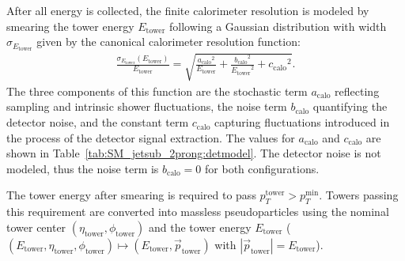 After all energy is collected, the finite calorimeter resolution is modeled by smearing the tower energy \ensuremath{E_{\text{tower}}}{} following a Gaussian distribution with width 
$\sigma_{\ensuremath{E_{\text{tower}}}}$ given by the canonical calorimeter resolution function:
\begin{align}
  \frac{\sigma_{\ensuremath{E_{\text{tower}}}}(\ensuremath{E_{\text{tower}}})}{\ensuremath{E_{\text{tower}}}} = \sqrt{\frac{\ensuremath{a_{\text{calo}}}^{2}}{\ensuremath{E_{\text{tower}}}} + \frac{\ensuremath{b_{\text{calo}}}^2}{\ensuremath{E_{\text{tower}}}^{2}} + \ensuremath{c_{\text{calo}}}^{2}}.
  \label{eq:SM_jetsub_2prong:caloreso}
\end{align}
The three components of this function are the stochastic term \ensuremath{a_{\text{calo}}}{} reflecting sampling and intrinsic shower fluctuations, the noise term \ensuremath{b_{\text{calo}}}{} quantifying the detector noise, 
and the constant term \ensuremath{c_{\text{calo}}}{} capturing fluctuations introduced in the process of the detector signal extraction.  
The values for \ensuremath{a_{\text{calo}}}{} and \ensuremath{c_{\text{calo}}}{} are shown in Table~\ref{tab:SM_jetsub_2prong:detmodel}. 
The detector noise is not modeled, thus the noise term is $\ensuremath{b_{\text{calo}}}=0$ for both configurations.

The tower energy after smearing is required to pass $\ensuremath{p_{T}^{\text{tower}}} > \ensuremath{p_{T}^{\text{min}}}$. 
Towers passing this requirement are converted into massless pseudoparticles using the 
nominal tower center $(\ensuremath{\eta_{\text{tower}}},\ensuremath{\phi_{\text{tower}}})$ and the tower energy \ensuremath{E_{\text{tower}}}{} ($(\ensuremath{E_{\text{tower}}},\ensuremath{\eta_{\text{tower}}},\ensuremath{\phi_{\text{tower}}}) \mapsto (\ensuremath{E_{\text{tower}}},\vec{p}_{\text{tower}})$ with $|\vec{p}_{\text{tower}}| = \ensuremath{E_{\text{tower}}}$).

